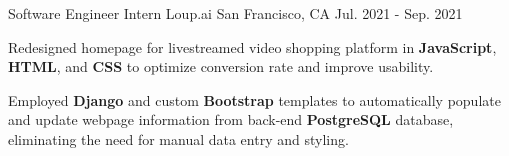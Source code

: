 \begin{cventries}
\cventry
  {Software Engineer Intern} %
  {Loup.ai} %
  {San Francisco, CA} %
  {Jul. 2021 - Sep. 2021} %
  {
    \begin{cvitems} %
      \item {Redesigned homepage for livestreamed video shopping platform in \textbf{JavaScript}, \textbf{HTML}, and \textbf{CSS} to optimize conversion rate and improve usability.}
      \item {Employed \textbf{Django} and custom \textbf{Bootstrap} templates to automatically populate and update webpage information from back-end \textbf{PostgreSQL} database, eliminating the need for manual data entry and styling.}
    \end{cvitems}
  }



\end{cventries}
